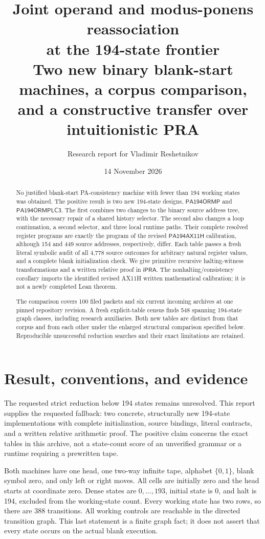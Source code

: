\documentclass[11pt,a4paper]{article}
\title{\textbf{Joint operand and modus-ponens reassociation\\ at the 194-state frontier}\\[8pt]
\large Two new binary blank-start machines, a corpus comparison,\\ and a constructive transfer over intuitionistic PRA}
\author{Research report for Vladimir Reshetnikov}
\date{14 November 2026}
\newcommand{\ipra}{\mathsf{iPRA}}
\newcommand{\Mone}{\mathsf{PA194ORMP}}
\newcommand{\Mtwo}{\mathsf{PA194ORMPLC3}}
\newcommand{\Mbase}{\mathsf{PA194AX11H}}
\begin{document}
\maketitle
\begin{abstract}
No justified blank-start PA-consistency machine with fewer than 194 working
states was obtained. The positive result is two new 194-state designs,
$\Mone$ and $\Mtwo$. The first combines two changes to the binary source
address tree, with the necessary repair of a shared history selector. The
second also changes a loop continuation, a second selector, and three local
runtime paths. Their complete resolved register programs are exactly the
program of the revised $\Mbase$ calibration, although 154 and 449 source
addresses, respectively, differ. Each table passes a fresh literal symbolic
audit of all 4,778 source outcomes for arbitrary natural register values,
and a complete blank initialization check. We give primitive recursive
halting-witness transformations and a written relative proof in $\ipra$.
The nonhalting/consistency corollary imports the identified revised AX11H
written mathematical calibration; it is not a newly completed Lean theorem.

The comparison covers 100 filed packets and six current incoming archives
at one pinned repository revision. A fresh explicit-table census finds 548
spanning 194-state graph classes, including research auxiliaries. Both new
tables are distinct from that corpus and from each other under the enlarged
structural comparison specified below. Reproducible unsuccessful reduction
searches and their exact limitations are retained.
\end{abstract}
\newpage
\tableofcontents
\newpage

\section{Result, conventions, and evidence}
\label{sec:result}

The requested strict reduction below 194 states remains unresolved. This
report supplies the requested fallback: two concrete, structurally new
194-state implementations with complete initialization, source bindings,
literal contracts, and a written relative arithmetic proof. The positive
claim concerns the exact tables in this archive, not a state-count score of
an unverified grammar or a runtime requiring a prewritten tape.

Both machines have one head, one two-way infinite tape, alphabet
$\{0,1\}$, blank symbol zero, and only left or right moves. All cells
are initially zero and the head starts at coordinate zero. Dense states
are $0,\ldots,193$, initial state is 0, and halt is 194, excluded from
the working-state count. Every working state has two rows, so there are
388 transitions. All working controls are reachable in the directed
transition graph. This last statement is a finite graph fact; it does not
assert that every state occurs on the actual blank execution.
\end{document}
